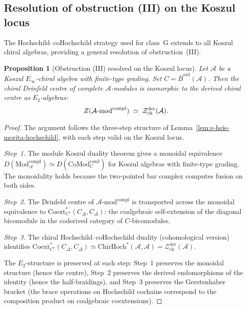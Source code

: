 \documentclass[11pt,reqno]{amsart}
\newtheorem{proposition}[theorem]{Proposition}
\theoremstyle{definition}
\theoremstyle{remark}
\providecommand{\cA}{\mathcal{A}}
\providecommand{\cZ}{\mathcal{Z}}
\providecommand{\Etwo}{E_2}
\providecommand{\Einf}{E_\infty}
\providecommand{\Barord}{\bar{B}^{\mathrm{ord}}}
\providecommand{\ChirHoch}{\mathrm{ChirHoch}}
\begin{document}
\subsection{Resolution of obstruction (III) on the Koszul locus}

The Hochschild--coHochschild strategy used for class~G
extends to all Koszul chiral algebras, providing a general
resolution of obstruction~(III).

\begin{proposition}[Obstruction (III) resolved on the Koszul locus]
\label{prop:e-obstruction-iii-koszul}
Let $\cA$ be a Koszul $\Einf$-chiral algebra with finite-type
grading. Set $C = \Barord(\cA)$. Then the chiral
Drinfeld centre of complete $\cA$-modules is isomorphic to
the derived chiral centre as $\Etwo$-algebras:
\begin{equation}\label{eq:e-obstruction-iii}
Z(\cA\textup{-mod}^{\mathrm{compl}})
\;\simeq\;
\cZ^{\mathrm{der}}_{\mathrm{ch}}(\cA).
\end{equation}
\end{proposition}

\begin{proof}
The argument follows the three-step structure of
Lemma~\ref{lem:e-heis-morita-hochschild}, with each
step valid on the Koszul locus.

\emph{Step~1.} The module Koszul duality theorem gives
a monoidal equivalence
$D(\mathrm{Mod}^{\mathrm{compl}}_\cA) \simeq
D(\mathrm{CoMod}^{\mathrm{conil}}_C)$
for Koszul algebras with finite-type grading. The
monoidality holds because the two-pointed bar complex
computes fusion on both sides.

\emph{Step~2.} The Drinfeld centre of
$\cA\text{-mod}^{\mathrm{compl}}$ is transported across
the monoidal equivalence to
$\mathrm{Coext}_{C^e}^*(C_\Delta, C_\Delta)$: the
coalgebraic self-extension of the diagonal bicomodule
in the coderived category of $C$-bicomodules.

\emph{Step~3.} The chiral Hochschild--coHochschild
duality (cohomological version) identifies
$\mathrm{Coext}_{C^e}^*(C_\Delta, C_\Delta)
\simeq \ChirHoch^*(\cA, \cA)
= \cZ^{\mathrm{der}}_{\mathrm{ch}}(\cA)$.

The $\Etwo$-structure is preserved at each step:
Step~1 preserves the monoidal structure (hence the
centre), Step~2 preserves the derived endomorphisms of
the identity (hence the half-braidings), and Step~3
preserves the Gerstenhaber bracket (the brace operations
on Hochschild cochains correspond to the composition product
on coalgebraic coextensions).
\end{proof}
\end{document}

